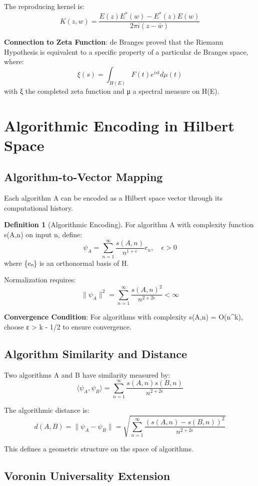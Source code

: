 \documentclass[12pt]{article}
\theoremstyle{plain}
\theoremstyle{definition}
\newtheorem{definition}[theorem]{Definition}
\begin{document}
The reproducing kernel is:
$$K(z, w) = \frac{E(z)E^*(w) - E^*(z)E(w)}{2\pi i(z - \bar{w})}$$

\textbf{Connection to Zeta Function}: de Branges proved that the Riemann Hypothesis is equivalent to a specific property of a particular de Branges space, where:
$$\xi(s) = \int_{H(E)} F(t) e^{ist} d\mu(t)$$
with ξ the completed zeta function and μ a spectral measure on H(E).

\section{Algorithmic Encoding in Hilbert Space}

\subsection{Algorithm-to-Vector Mapping}

Each algorithm A can be encoded as a Hilbert space vector through its computational history.

\begin{definition}[Algorithmic Encoding]
For algorithm A with complexity function s(A,n) on input n, define:
$$\psi_A = \sum_{n=1}^{\infty} \frac{s(A,n)}{n^{1 + \epsilon}} e_n, \quad \epsilon > 0$$
where \{eₙ\} is an orthonormal basis of H.

Normalization requires:
$$\|\psi_A\|^2 = \sum_{n=1}^{\infty} \frac{s(A,n)^2}{n^{2 + 2\epsilon}} < \infty$$
\end{definition}

\textbf{Convergence Condition}: For algorithms with complexity s(A,n) = O(n^k), choose ε > k - 1/2 to ensure convergence.

\subsection{Algorithm Similarity and Distance}

Two algorithms A and B have similarity measured by:
$$\langle \psi_A, \psi_B \rangle = \sum_{n=1}^{\infty} \frac{s(A,n) s(B,n)}{n^{2+2\epsilon}}$$

The algorithmic distance is:
$$d(A, B) = \|\psi_A - \psi_B\| = \sqrt{\sum_{n=1}^{\infty} \frac{(s(A,n) - s(B,n))^2}{n^{2+2\epsilon}}}$$

This defines a geometric structure on the space of algorithms.

\subsection{Voronin Universality Extension}
\end{document}
